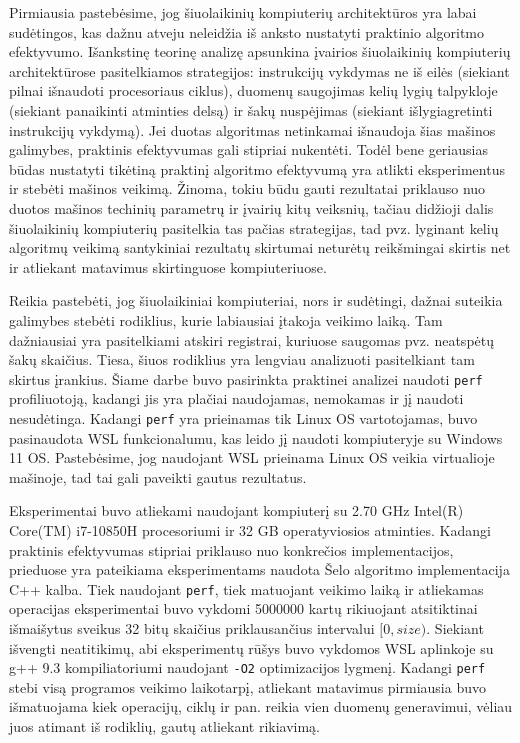 \documentclass{VUMIFInfBakalaurinis}
\begin{document}
Pirmiausia pastebėsime, jog šiuolaikinių kompiuterių architektūros yra labai sudėtingos, kas dažnu atveju neleidžia iš anksto nustatyti praktinio algoritmo efektyvumo.
Išankstinę teorinę analizę apsunkina įvairios šiuolaikinių kompiuterių architektūrose pasitelkiamos strategijos:
instrukcijų vykdymas ne iš eilės (siekiant pilnai išnaudoti procesoriaus ciklus),
duomenų saugojimas kelių lygių talpykloje (siekiant panaikinti atminties delsą) ir
šakų nuspėjimas (siekiant išlygiagretinti instrukcijų vykdymą).
Jei duotas algoritmas netinkamai išnaudoja šias mašinos galimybes, praktinis efektyvumas gali stipriai nukentėti.
Todėl bene geriausias būdas nustatyti tikėtiną praktinį algoritmo efektyvumą yra atlikti eksperimentus ir stebėti mašinos veikimą.
Žinoma, tokiu būdu gauti rezultatai priklauso nuo duotos mašinos techinių parametrų ir įvairių kitų veiksnių, tačiau didžioji dalis
šiuolaikinių kompiuterių pasitelkia tas pačias strategijas, tad pvz. lyginant kelių algoritmų veikimą
santykiniai rezultatų skirtumai neturėtų reikšmingai skirtis net ir atliekant matavimus skirtinguose kompiuteriuose.  

Reikia pastebėti, jog šiuolaikiniai kompiuteriai, nors ir sudėtingi, dažnai suteikia galimybes stebėti rodiklius, kurie labiausiai įtakoja veikimo laiką.
Tam dažniausiai yra pasitelkiami atskiri registrai, kuriuose saugomas pvz. neatspėtų šakų skaičius.
Tiesa, šiuos rodiklius yra lengviau analizuoti pasitelkiant tam skirtus įrankius.
Šiame darbe buvo pasirinkta praktinei analizei naudoti \verb|perf| profiliuotoją, kadangi jis yra plačiai naudojamas, nemokamas ir jį naudoti nesudėtinga.
Kadangi \verb|perf| yra prieinamas tik Linux OS vartotojamas, buvo pasinaudota WSL funkcionalumu, kas leido jį naudoti kompiuteryje su Windows 11 OS.
Pastebėsime, jog naudojant WSL prieinama Linux OS veikia virtualioje mašinoje, tad tai gali paveikti gautus rezultatus. 

Eksperimentai buvo atliekami naudojant kompiuterį su 2.70 GHz Intel(R) Core(TM) i7-10850H procesoriumi ir 32 GB operatyviosios atminties.
Kadangi praktinis efektyvumas stipriai priklauso nuo konkrečios implementacijos, prieduose yra pateikiama eksperimentams naudota Šelo algoritmo implementacija C++ kalba.
Tiek naudojant \verb|perf|, tiek matuojant veikimo laiką ir atliekamas operacijas eksperimentai buvo vykdomi 5000000 kartų rikiuojant atsitiktinai išmaišytus sveikus 32 bitų skaičius priklausančius intervalui $[0, size)$.
Siekiant išvengti neatitikimų, abi eksperimentų rūšys buvo vykdomos WSL aplinkoje su g++ 9.3 kompiliatoriumi naudojant \verb|-O2| optimizacijos lygmenį.
Kadangi \verb|perf| stebi visą programos veikimo laikotarpį, atliekant matavimus pirmiausia buvo išmatuojama kiek operacijų, ciklų ir pan. reikia vien duomenų generavimui,
vėliau juos atimant iš rodiklių, gautų atliekant rikiavimą.
\end{document}
